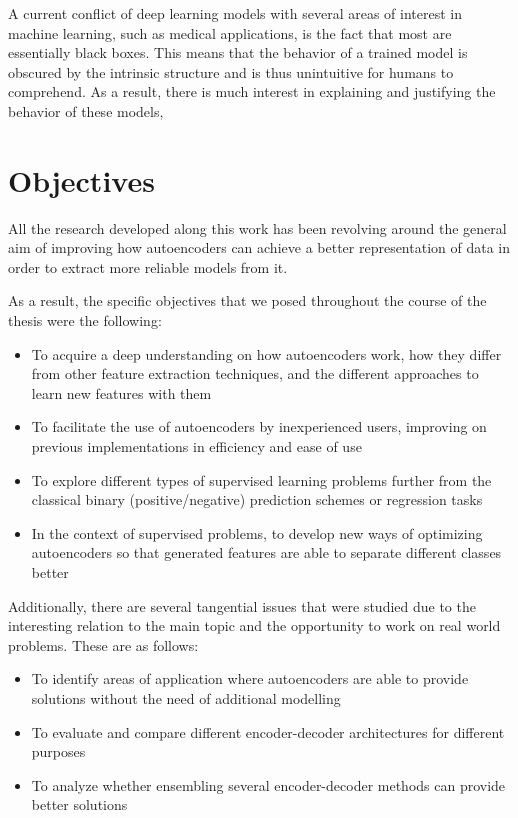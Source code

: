 
A current conflict of deep learning models with several areas of interest in machine learning, such as medical applications, is the fact that most are essentially black boxes. This means that the behavior of a trained model is obscured by the intrinsic structure and is thus unintuitive for humans to comprehend. As a result, there is much interest in explaining and justifying the behavior of these models, 

\section{Objectives}

All the research developed along this work has been revolving around the general aim of improving how autoencoders can achieve a better representation of data in order to extract more reliable models from it. 

As a result, the specific objectives that we posed throughout the course of the thesis were the following:

\begin{itemize}
    \item To acquire a deep understanding on how autoencoders work, how they differ from other feature extraction techniques, and the different approaches to learn new features with them
    \item To facilitate the use of autoencoders by inexperienced users, improving on previous implementations in efficiency and ease of use
    \item To explore different types of supervised learning problems further from the classical binary (positive/negative) prediction schemes or regression tasks
    \item In the context of supervised problems, to develop new ways of optimizing autoencoders so that generated features are able to separate different classes better
\end{itemize}

Additionally, there are several tangential issues that were studied due to the interesting relation to the main topic and the opportunity to work on real world problems. These are as follows:

\begin{itemize}
    \item To identify areas of application where autoencoders are able to provide solutions without the need of additional modelling
    \item To evaluate and compare different encoder-decoder architectures for different purposes 
    \item To analyze whether ensembling several encoder-decoder methods can provide better solutions
\end{itemize}

